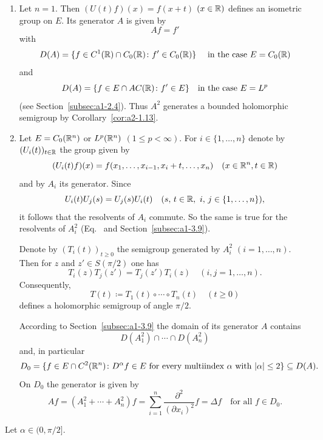 \begin{example*}[The Laplacian on $E = C_{0}(\R^{n})$ or $L^{p}(\R^{n})$ $(1 \leq p < \infty)$]\label{ex:a2-1.13-kgk} 
\begin{enumerate}[\upshape (i), wide, labelindent=.25em]
\item \label{ex:a2-1.13-kgk-1}
Let $n = 1$.
Then $(U(t)f)(x) = f(x+t)$ $(x \in \mathbb{R})$ defines an isometric group on $E$.
Its generator $A$ is given by 
\[
Af = f'
\]  
with
\[
D(A) = \{f \in C^{1}(\mathbb{R}) \cap C_{0}(\mathbb{R}) \colon f' \in C_{0}(\mathbb{R})\}
\quad \text{ in the case } E = C_{0}(\mathbb{R})
\]
and
\[
D(A) = \{f \in E \cap AC(\mathbb{R}) \colon f' \in E\} \quad \text{in the case } E = L^{p}
\] 
(see Section~\ref{subsec:a1-2.4}).
Thus $A^{2}$ generates a bounded holomorphic semigroup by Corollary~\ref{cor:a2-1.13}. 
\item \label{ex:a2-1.13-kgk-2}
Let $E = C_{0}(\R^{n})$ or $L^{p}(\R^{n})$ $(1 \leq p < \infty)$.
For $i \in \{1,\ldots,n\}$ denote by $(U_{i}(t))_{t \in \mathbb{R}}$ the group given by 
\[
(U_{i}(t)f)(x) = f(x_{1},\ldots,x_{i-1},x_{i}+t,\ldots,x_{n}) \quad  (x \in \mathbb{R}^{n}, t \in \mathbb{R})
\]
and by $A_{i}$ its generator.
Since 
\[ U_{i}(t)U_{j}(s) = U_{j}(s)U_{i}(t) \quad (s,\,t \in \mathbb{R},\ i,\,j \in \{1, \ldots, n \}), 
\]
it follows that the resolvents of\/ $A_{i}$ commute.
So the same is true for the resolvents of\/ $A_{i}^{2}$ (\cf Eq.~ and 
Section~\ref{subsec:a1-3.9}). 

Denote by $(T_{i}(t))_{t \geq 0}$ 
the semigroup generated by $A_{i}^{2}$ $(i=1,\ldots,n)$.
Then for $z$ and $z' \in S(\pi/2)$ one has 
%
\[
	T_{i}(z)T_{j}(z') = T_{j}(z')T_{i}(z) \quad (i,j=1,\ldots,n) .
\]
%
Consequently, 
%
\[
	T(t) \coloneq T_{1}(t) \circ \cdots \circ T_{n}(t) \quad (t \geq 0)
\]
%
defines a holomorphic semigroup of angle $\pi/2$.

According to Section~\ref{subsec:a1-3.9} the domain of its generator $A$ contains 
%
\[
	D(A_{1}^{2}) \cap \cdots \cap D(A_{n}^{2})
\]
%
and, in particular
\[
D_{0} = \{f \in E \cap C^{2}(\R^{n}) \colon D^{\alpha}f \in E \text{ for every multiindex } \alpha \text{ with } |\alpha| \leq 2\} \subseteq D(A) .
\]
On $D_{0}$ the generator is given by
\[
    Af = (A_{1}^{2} + \cdots + A_{n}^{2})f =
    \sum_{i = 1}^{n} \frac{\partial^{2}}{(\partial x_{i})^{2}} f
    = \Delta f \quad \text{for all $f \in D_{0}$.} 
\]
\end{enumerate}
\end{example*}
Let $\alpha \in (0,\pi/2]$.
